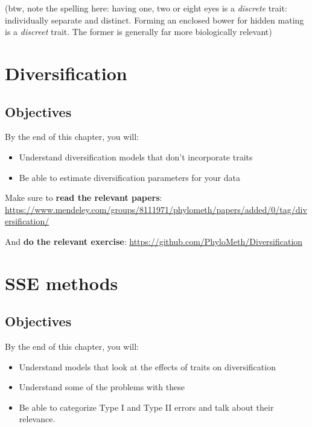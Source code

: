 \documentclass[]{article}
\providecommand{\tightlist}{%
  \setlength{\itemsep}{0pt}\setlength{\parskip}{0pt}}
\theoremstyle{definition}
\theoremstyle{definition}
\theoremstyle{definition}
\theoremstyle{remark}
\begin{document}
(btw, note the spelling here: having one, two or eight eyes is a
\emph{discrete} trait: individually separate and distinct. Forming an
enclosed bower for hidden mating is a \emph{discreet} trait. The former
is generally far more biologically relevant)

\hypertarget{diversification}{%
\section{Diversification}\label{diversification}}

\hypertarget{objectives-4}{%
\subsection{Objectives}\label{objectives-4}}

By the end of this chapter, you will:

\begin{itemize}
\tightlist
\item
  Understand diversification models that don't incorporate traits
\item
  Be able to estimate diversification parameters for your data
\end{itemize}

Make sure to \textbf{read the relevant papers}:
\url{https://www.mendeley.com/groups/8111971/phylometh/papers/added/0/tag/diversification/}

And \textbf{do the relevant exercise}:
\url{https://github.com/PhyloMeth/Diversification}

\hypertarget{sse-methods}{%
\section{SSE methods}\label{sse-methods}}

\hypertarget{objectives-5}{%
\subsection{Objectives}\label{objectives-5}}

By the end of this chapter, you will:

\begin{itemize}
\tightlist
\item
  Understand models that look at the effects of traits on
  diversification
\item
  Understand some of the problems with these
\item
  Be able to categorize Type I and Type II errors and talk about their
  relevance.
\end{itemize}
\end{document}
